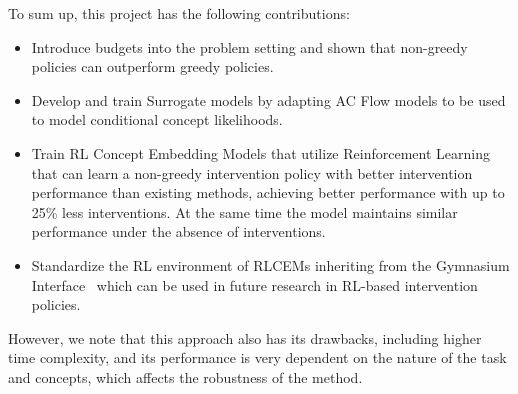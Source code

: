 To sum up, this project has the following contributions:
\begin{itemize}
    \item Introduce budgets into the problem setting and shown that non-greedy policies can outperform greedy policies.
    \item Develop and train Surrogate models by adapting AC Flow models to be used to model conditional concept likelihoods.
    \item Train RL Concept Embedding Models that utilize Reinforcement Learning
    that can learn a non-greedy intervention policy
    with better intervention performance than existing methods, achieving better performance
    with up to 25\% less interventions. At the same time the model maintains similar performance under 
the absence of interventions. 
    \item Standardize the RL environment of RLCEMs inheriting from the Gymnasium Interface~\cite{gymnasium} which
    can be used in future research in RL-based intervention policies.
\end{itemize}

However, we note that
this approach also has its drawbacks, including
higher time complexity, and its performance is very dependent on 
the nature of the task and concepts, which affects the robustness of the method.




